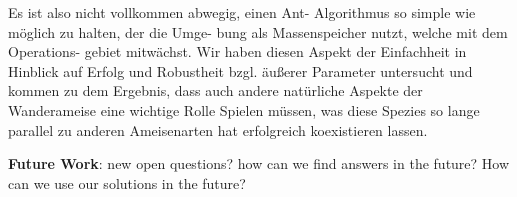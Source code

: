 Es ist also nicht vollkommen abwegig, einen Ant- Algorithmus so simple
wie möglich zu halten, der die Umge- bung als Massenspeicher nutzt,
welche mit dem Operations- gebiet mitwächst. Wir haben diesen Aspekt der
Einfachheit in Hinblick auf Erfolg und Robustheit bzgl. äußerer
Parameter untersucht und kommen zu dem Ergebnis, dass auch andere
natürliche Aspekte der Wanderameise eine wichtige Rolle Spielen müssen,
was diese Spezies so lange parallel zu anderen Ameisenarten hat
erfolgreich koexistieren lassen.

\textbf{Future Work}: new open questions? how can we find answers in the
future? How can we use our solutions in the future?
